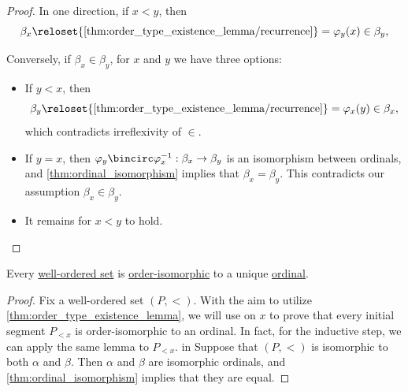 \begin{proof}
  In one direction, if \( x < y \), then
  \begin{equation*}
    \beta_x
    \reloset {\ref{thm:order_type_existence_lemma/recurrence}} =
    \varphi_y(x)
    \in
    \beta_y,
  \end{equation*}

  Conversely, if \( \beta_x \in \beta_y \), for \( x \) and \( y \) we have three options:
  \begin{itemize}
    \item If \( y < x \), then
    \begin{equation*}
      \beta_y
      \reloset {\ref{thm:order_type_existence_lemma/recurrence}} =
      \varphi_x(y)
      \in
      \beta_x,
    \end{equation*}
    which contradicts irreflexivity of \( {\in} \).

    \item If \( y = x \), then \( \varphi_y \bincirc \varphi_x^{-1}: \beta_x \to \beta_y \) is an isomorphism between ordinals, and \cref{thm:ordinal_isomorphism} implies that \( \beta_x = \beta_y \). This contradicts our assumption \( \beta_x \in \beta_y \).

    \item It remains for \( x < y \) to hold.
  \end{itemize}
\end{proof}

\begin{proposition}\label{thm:order_type_existence}
  Every \hyperref[def:well_ordered_set]{well-ordered set} is \hyperref[def:partially_ordered_set/morphism]{order-isomorphic} to a unique \hyperref[def:ordinal]{ordinal}.
\end{proposition}
\begin{proof}
  \ExistenceSubProof Fix a well-ordered set \( (P, <) \). With the aim to utilize \cref{thm:order_type_existence_lemma}, we will use  on \( x \) to prove that every initial segment \( P_{<x} \) is order-isomorphic to an ordinal. In fact, for the inductive step, we can apply the same lemma to \( P_{<x} \).
in
  \UniquenessSubProof Suppose that \( (P, <) \) is isomorphic to both \( \alpha \) and \( \beta \). Then \( \alpha \) and \( \beta \) are isomorphic ordinals, and \cref{thm:ordinal_isomorphism} implies that they are equal.
\end{proof}

